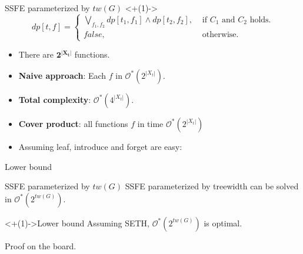 \documentclass{beamer}
\newcommand{\nextslide}[1]{\onslide<+(1)->{#1}}
\begin{document}
\begin{frame}[t]{SSFE parameterized by $tw(G)$}
\nextslide{
\begin{equation*}
dp[t,f] = \begin{cases}
\bigvee\limits_{f_1,f_2} dp[t_1,f_1] \land dp[t_2,f_2], &\text{ if $C_1$ and $C_2$ holds.} \\
false, &\text{ otherwise.}
\end{cases}
\end{equation*}
}

\setlength{\leftmargini}{2pt}
\begin{itemize}[<+(1)->]
	\item[] There are $\mathbf{2^{|X_t|}}$ functions. 
	\smallskip
	\item[] \textbf{Naive approach}: Each $f$ in $\mathcal{O}^*(2^{|X_t|})$.
	\smallskip
	\item[] \textbf{Total complexity}: $\mathcal{O}^*(4^{|X_t|})$.
	\bigskip
	\item[] \textbf{Cover product}: all functions $f$ in time $\mathcal{O}^*(2^{|X_t|})$ 
	\bigskip
	\item[] Assuming leaf, introduce and forget are easy:
\end{itemize}

\end{frame}

\begin{frame}[t]{Lower bound}
	\begin{block}{SSFE parameterized by $tw(G)$}
		SSFE parameterized by treewidth can be solved in $\mathcal{O}^*(2^{tw(G)})$.
	\end{block}
	
	\begin{block}<+(1)->{Lower bound}
		Assuming SETH, $\mathcal{O}^*(2^{tw(G)})$ is optimal.
	\end{block}

	\onslide<+-> { Proof on the board.}
\end{frame}
\end{document}
